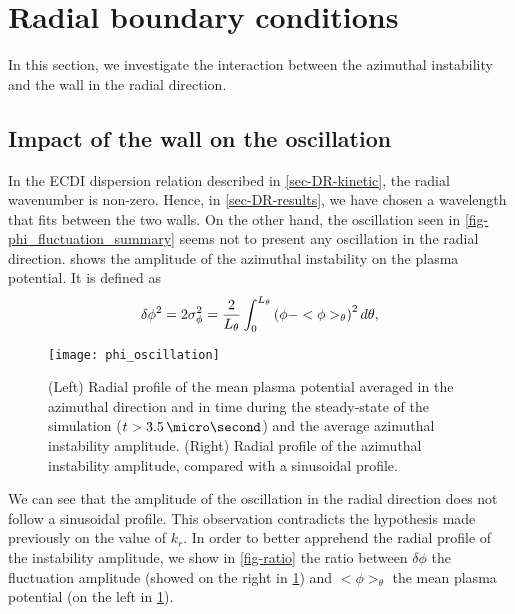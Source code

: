 
\section{Radial boundary conditions}
  \label{sec-DR-BC}
  
  In this section, we investigate the interaction between the azimuthal instability and the wall in the radial direction.
  
  \subsection{Impact of the wall on the oscillation}
  \label{subsec-kr}
  
  In the \ac{ECDI} dispersion relation described in \cref{sec-DR-kinetic}, the radial wavenumber is non-zero.
  Hence, in \cref{sec-DR-results}, we have chosen a wavelength that fits between the two walls.
  On the other hand, the oscillation seen in \cref{fig-phi_fluctuation_summary} seems not to present any oscillation in the radial direction.
   shows the amplitude of the azimuthal instability on the plasma potential.
  It is defined as
  \begin{equation} \label{eq-stdphi}
    \delta \phi^2 = 2 \sigma_{\phi}^2 = \frac{{2}}{L_{\theta}} \int_0^{L_{\theta}} \left(  \phi - <\phi>_{\theta}  \right) ^2 d\theta,
  \end{equation}
  
  \begin{figure}[hbt]
    \centering
    \texttt{[image: phi\_oscillation]}
    \caption{(Left) Radial profile of the mean plasma potential averaged in the azimuthal direction  and in time during the steady-state of the simulation ($t > 3.5 \,\micro\second$) and the average azimuthal instability amplitude. (Right) Radial profile of the  azimuthal instability amplitude, compared with a sinusoidal profile. }
    \label{fig-phi_osci_profile}
  \end{figure}
  
  
  We can see that the amplitude of the oscillation in the radial direction does not follow a sinusoidal profile.
  This observation contradicts the hypothesis made previously on the value of $k_r$.
  In order to better apprehend the radial profile of the instability amplitude, we show in \cref{fig-ratio} the ratio between $\delta \phi$ the fluctuation amplitude (showed on the right in \cref{fig-phi_osci_profile}) and $<\phi>_{\theta}$  the mean plasma potential (on the left in \cref{fig-phi_osci_profile}).
  
